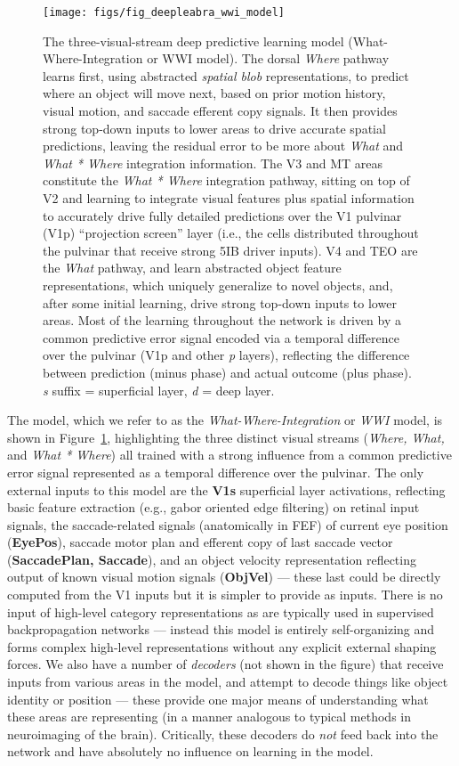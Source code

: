 \documentclass[11pt,twoside]{article}
\newif\myifpdf
\begin{document}
\begin{figure}
  \centering\texttt{[image: figs/fig\_deepleabra\_wwi\_model]}
  \caption{\footnotesize The three-visual-stream deep predictive learning model (What-Where-Integration or WWI model). The dorsal {\em Where} pathway learns first, using abstracted {\em spatial blob} representations, to predict where an object will move next, based on prior motion history, visual motion, and saccade efferent copy signals.  It then provides strong top-down inputs to lower areas to drive accurate spatial predictions, leaving the residual error to be more about {\em What} and {\em What * Where} integration information.  The V3 and MT areas constitute the {\em What * Where} integration pathway, sitting on top of V2 and learning to integrate visual features plus spatial information to accurately drive fully detailed predictions over the V1 pulvinar (V1p) ``projection screen'' layer (i.e., the cells distributed throughout the pulvinar that receive strong 5IB driver inputs).  V4 and TEO are the {\em What} pathway, and learn abstracted object feature representations, which uniquely generalize to novel objects, and, after some initial learning, drive strong top-down inputs to lower areas.  Most of the learning throughout the network is driven by a common predictive error signal encoded via a temporal difference over the pulvinar (V1p and other {\em p} layers), reflecting the difference between prediction (minus phase) and actual outcome (plus phase). {\em s} suffix = superficial  layer, {\em d} = deep layer.}
  \label{fig.wwi_model}
\end{figure}

The model, which we refer to as the {\em What-Where-Integration} or {\em WWI} model, is shown in Figure~\ref{fig.wwi_model}, highlighting the three distinct visual streams ({\em Where, What,} and {\em What * Where}) all trained with a strong influence from a common predictive error signal represented as a temporal difference over the pulvinar.  The only external inputs to this model are the {\bf V1s} superficial layer activations, reflecting basic feature extraction (e.g., gabor oriented edge filtering) on retinal input signals, the saccade-related signals (anatomically in FEF) of current eye position ({\bf EyePos}), saccade motor plan and efferent copy of last saccade vector ({\bf SaccadePlan, Saccade}), and an object velocity representation reflecting output of known visual motion signals ({\bf ObjVel}) --- these last could be directly computed from the V1 inputs but it is simpler to provide as inputs.  There is no input of high-level category representations as are typically used in supervised backpropagation networks --- instead this model is entirely self-organizing and forms complex high-level representations without any explicit external shaping forces.  We also have a number of {\em decoders} (not shown in the figure) that receive inputs from various areas in the model, and attempt to decode things like object identity or position --- these provide one major means of understanding what these areas are representing (in a manner analogous to typical methods in neuroimaging of the brain).  Critically, these decoders do {\em not} feed back into the network and have absolutely no influence on learning in the model.
\end{document}
